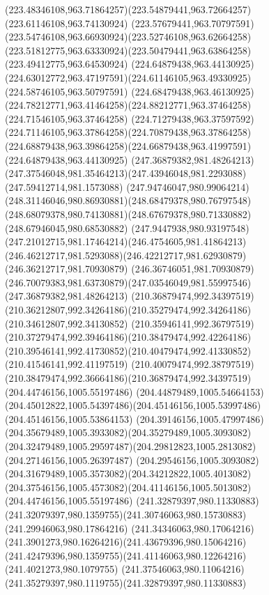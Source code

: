 {{	\curveto(223.48346108,963.71864257)(223.54879441,963.72664257)(223.61146108,963.74130924)
	\curveto(223.57679441,963.70797591)(223.54746108,963.66930924)(223.52746108,963.62664258)
	\curveto(223.51812775,963.63330924)(223.50479441,963.63864258)(223.49412775,963.64530924)
	\moveto(224.64879438,963.44130925)
	\curveto(224.63012772,963.47197591)(224.61146105,963.49330925)(224.58746105,963.50797591)
	\curveto(224.68479438,963.46130925)(224.78212771,963.41464258)(224.88212771,963.37464258)
	\lineto(224.71546105,963.37464258)
	\curveto(224.71279438,963.37597592)(224.71146105,963.37864258)(224.70879438,963.37864258)
	\curveto(224.68879438,963.39864258)(224.66879438,963.41997591)(224.64879438,963.44130925)
	\moveto(247.36879382,981.48264213)
	\curveto(247.37546048,981.35464213)(247.43946048,981.2293088)(247.59412714,981.1573088)
	\curveto(247.94746047,980.99064214)(248.31146046,980.86930881)(248.68479378,980.76797548)
	\curveto(248.68079378,980.74130881)(248.67679378,980.71330882)(248.67946045,980.68530882)
	\curveto(247.9447938,980.93197548)(247.21012715,981.17464214)(246.4754605,981.41864213)
	\curveto(246.46212717,981.5293088)(246.42212717,981.62930879)(246.36212717,981.70930879)
	\lineto(246.36746051,981.70930879)
	\curveto(246.70079383,981.63730879)(247.03546049,981.55997546)(247.36879382,981.48264213)
	\moveto(210.36879474,992.34397519)
	\curveto(210.36212807,992.34264186)(210.35279474,992.34264186)(210.34612807,992.34130852)
	\curveto(210.35946141,992.36797519)(210.37279474,992.39464186)(210.38479474,992.42264186)
	\curveto(210.39546141,992.41730852)(210.40479474,992.41330852)(210.41546141,992.41197519)
	\curveto(210.40079474,992.38797519)(210.38479474,992.36664186)(210.36879474,992.34397519)
	\moveto(204.44746156,1005.55197486)
	\curveto(204.44879489,1005.54664153)(204.45012822,1005.54397486)(204.45146156,1005.53997486)
	\lineto(204.45146156,1005.53864153)
	\curveto(204.39146156,1005.47997486)(204.35679489,1005.3933082)(204.35279489,1005.3093082)
	\curveto(204.32479489,1005.29597487)(204.29812823,1005.2813082)(204.27146156,1005.26397487)
	\curveto(204.29546156,1005.3093082)(204.31679489,1005.3573082)(204.34212822,1005.4013082)
	\curveto(204.37546156,1005.4573082)(204.41146156,1005.5013082)(204.44746156,1005.55197486)
	\moveto(241.32879397,980.11330883)
	\curveto(241.32079397,980.1359755)(241.30746063,980.15730883)(241.29946063,980.17864216)
	\curveto(241.34346063,980.17064216)(241.3901273,980.16264216)(241.43679396,980.15064216)
	\curveto(241.42479396,980.1359755)(241.41146063,980.12264216)(241.4021273,980.1079755)
	\curveto(241.37546063,980.11064216)(241.35279397,980.1119755)(241.32879397,980.11330883)
}}
